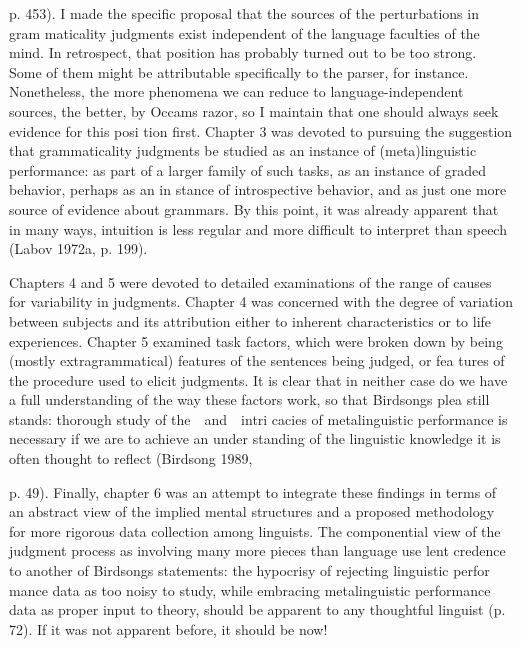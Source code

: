 \begin{styleTextbody}
p. 453). I made the specific proposal that the sources of the perturbations in gram\- maticality judgments exist independent of the language faculties of the mind. In retrospect, that position has probably turned out to be too strong. Some of them might be attributable specifically to the parser, for instance. Nonetheless, the more phenomena we can reduce to language-independent sources, the better, by Occam{\textquotesingle}s razor, so I maintain that one should always seek evidence for this posi\- tion first. Chapter 3 was devoted to pursuing the suggestion that grammaticality judgments be studied as an instance of (meta)linguistic performance: as part of a larger family of such tasks, as an instance of graded behavior, perhaps as an in\- stance of introspective behavior, and as just one more source of evidence about grammars. By this point, it was already apparent that {\textquotedbl}in many ways, intuition is less regular and more difficult to interpret than speech{\textquotedbl} (Labov 1972a, p. 199).
\end{styleTextbody}


\begin{styleTextbody}
Chapters 4 and 5 were devoted to detailed examinations of the range of causes for variability in judgments. Chapter 4 was concerned with the degree of variation between subjects and its attribution either to inherent characteristics or to life experiences. Chapter 5 examined task factors, which were broken down by being (mostly extragrammatical) features of the sentences being judged, or fea\- tures of the procedure used to elicit judgments. It is clear that in neither case do we have a full understanding of the way these factors work, so that Birdsong{\textquotesingle}s plea still stands: {\textquotedbl}thorough study of the\ \ and\ \ intri cacies of metalinguistic performance is necessary if we are to achieve an under\- standing of the linguistic knowledge it is often thought to reflect{\textquotedbl} (Birdsong 1989,
\end{styleTextbody}


\begin{styleTextbody}
p. 49). Finally, chapter 6 was an attempt to integrate these findings in terms of an abstract view of the implied mental structures and a proposed methodology for more rigorous data collection among linguists. The componential view of the judgment process as involving many more pieces than language use lent credence to another of Birdsong{\textquotesingle}s statements: {\textquotedbl}the hypocrisy of rejecting linguistic perfor\- mance data as too noisy to study, while embracing metalinguistic performance data as proper input to theory, should be apparent to any thoughtful linguist{\textquotedbl} (p. 72). If it was not apparent before, it should be now!
\end{styleTextbody}


